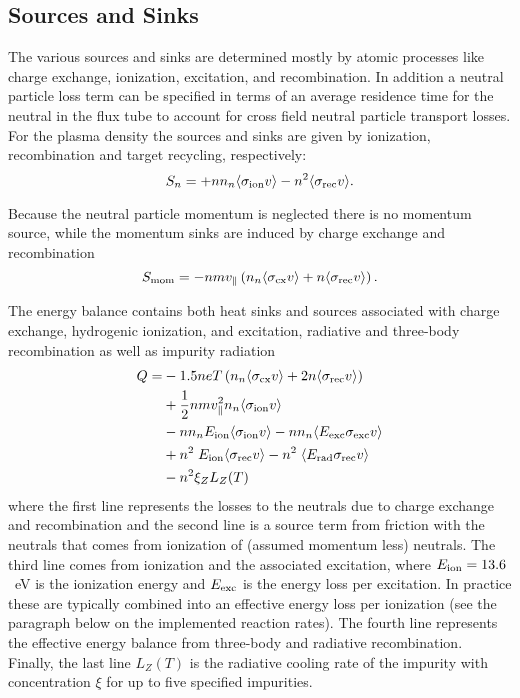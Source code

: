 \documentclass[amsmath,amssymb,a4]{revtex4-2}
\begin{document}
\subsection{Sources and Sinks}

The various sources and sinks are determined mostly by atomic processes like charge exchange, ionization, excitation, and recombination. In addition a neutral particle loss term can be specified in terms of an average residence time for the neutral in the flux tube to account for cross field neutral particle transport losses. For the plasma density the sources and sinks are given by ionization, recombination and target recycling, respectively:
\begin{equation}\label{particle_source}
    S_n = + n n_n \langle\sigma_{\rm ion} v\rangle - n^2 \langle\sigma_{\rm rec} v\rangle.
\end{equation}

Because the neutral particle momentum is neglected there is no momentum source, while the momentum sinks are induced by charge exchange and recombination
\begin{equation}\label{momentum_source}
    S_{\rm mom} = - n m v_\parallel \left(n_n \langle\sigma_{\rm cx} v\rangle + n \langle\sigma_{\rm rec} v\rangle \right).
\end{equation}

The energy balance contains both heat sinks and sources associated with charge exchange, hydrogenic ionization, and excitation, radiative and three-body recombination as well as impurity radiation
\begin{equation}\label{energy_source}
\begin{split}
    Q = &- 1.5 n e T \left(n_n \langle\sigma_{\rm cx} v\rangle + 2 n \langle\sigma_{\rm rec} v\rangle \right) \\
        &+ \frac{1}{2} n m v^2_\parallel n_n \langle\sigma_{\rm ion} v\rangle\\
        &- n n_n E_{\rm ion} \langle \sigma_{\rm ion} v\rangle - n n_n \langle E_{\rm exc} \sigma_{\rm exc} v\rangle \\
        &+ n^2 \;E_{\rm ion} \langle \sigma_{\rm rec} v\rangle - n^2 \;\langle E_{\rm rad} \sigma_{\rm rec} v\rangle \\
        &- n^2 \xi_Z L_Z(T)
\end{split}
\end{equation}
where the first line represents the losses to the neutrals due to charge exchange and recombination and the second line is a source term from friction with the neutrals that comes from ionization of (assumed momentum less) neutrals. The third line comes from ionization and the associated excitation, where $E_{\rm ion} = 13.6$~eV is the ionization energy and $E_{\rm exc}$ is the energy loss per excitation. In practice these are typically combined into an effective energy loss per ionization (see the paragraph below on the implemented reaction rates). The fourth line represents the effective energy balance from three-body and radiative recombination. Finally, the last line $L_Z(T)$ is the radiative cooling rate of the impurity with concentration $\xi$ for up to five specified impurities. 
\end{document}
